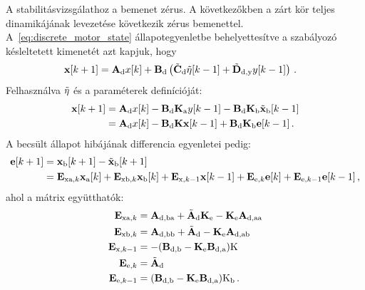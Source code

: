 A stabilitásvizsgálathoz a bemenet zérus. A következőkben a zárt kör teljes dinamikájának levezetése 
következik zérus bemenettel. A~\eqref{eq:discrete_motor_state} állapotegyenletbe behelyettesítve a 
szabályozó késleltetett kimenetét azt kapjuk, hogy
\begin{align}
    \begin{split}
    \mathbf{x}[k+1] &= \mathbf{A}_{\mathrm{d}} x[k] + 
    \mathbf{B}_{\mathrm{d}} \left(\tilde{\mathbf{C}}_{\mathrm{d}} \tilde{\mathbf{\eta}}[k-1] + 
    \tilde{\mathbf{D}}_{\mathrm{d,y}} y[k-1]\right)\,.
    \end{split}        
\end{align}
Felhasználva \(\tilde{\mathbf{\eta}}\) és a paraméterek definícióját:
\begin{align}\label{eq:discrete_motor_state_closed}
    \begin{split}
        \mathbf{x}[k+1] &= \mathbf{A}_{\mathrm{d}} x[k] - 
        \mathbf{B}_{\mathrm{d}} \mathbf{K}_{\mathrm{a}} y[k-1] - 
        \mathbf{B}_{\mathrm{d}} \mathbf{K}_{\mathrm{b}} \tilde{\mathbf{x}}_{\mathrm{b}}[k-1] \\
        &= \mathbf{A}_{\mathrm{d}} x[k] - 
        \mathbf{B}_{\mathrm{d}} \mathbf{K} \mathbf{x}[k-1] +
        \mathbf{B}_{\mathrm{d}} \mathbf{K}_{\mathrm{b}} \mathbf{e}[k-1]\,.
    \end{split}        
\end{align}
A becsült állapot hibájának differencia egyenletei pedig:
\begin{align}
    \begin{split}
        \mathbf{e}[k+1] &= \mathbf{x}_{\mathrm{b}}[k+1] - \tilde{\mathbf{x}}_{\mathrm{b}}[k+1] \\
        &= \mathbf{E}_{\mathrm{xa},k}\mathbf{x}_{\mathrm{a}}[k] + 
        \mathbf{E}_{\mathrm{xb},k}\mathbf{x}_{\mathrm{b}}[k] + 
        \mathbf{E}_{\mathrm{x},k-1}\mathbf{x}[k-1] + 
        \mathbf{E}_{\mathrm{e},k}\mathbf{e}[k] + 
        \mathbf{E}_{\mathrm{e},k-1}\mathbf{e}[k-1]
        \,,
    \end{split}        
\end{align}
ahol a mátrix együtthatók:
\begin{align}
    \begin{split}
        \mathbf{E}_{\mathrm{xa},k} &= \mathbf{A}_{\mathrm{d,ba}} + 
        \tilde{\mathbf{A}}_{\mathrm{d}} \mathbf{K}_{\mathrm{e}} -
        \mathbf{K}_{\mathrm{e}} \mathbf{A}_{\mathrm{d,aa}} \\
        \mathbf{E}_{\mathrm{xb},k} &= \mathbf{A}_{\mathrm{d,bb}} + 
        \tilde{\mathbf{A}}_{\mathrm{d}} -
        \mathbf{K}_{\mathrm{e}} \mathbf{A}_{\mathrm{d,ab}} \\
        \mathbf{E}_{\mathrm{x},k-1} &= -(\mathbf{B}_{\mathrm{d,b}} -
        \mathbf{K}_{\mathrm{e}} \mathbf{B}_{\mathrm{d,a}})\mathrm{K} \\
        \mathbf{E}_{\mathrm{e},k} &= \tilde{\mathbf{A}}_{\mathrm{d}} \\
        \mathbf{E}_{\mathrm{e},k-1} &= (\mathbf{B}_{\mathrm{d,b}} -
        \mathbf{K}_{\mathrm{e}} \mathbf{B}_{\mathrm{d,a}})\mathrm{K}_{\mathrm{b}}\,.
    \end{split}        
\end{align}
